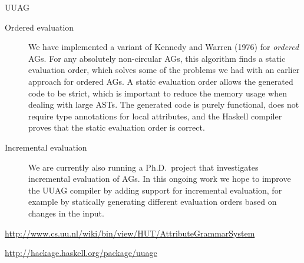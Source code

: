 \begin{hcarentry}[updated]{UUAG}
\begin{description}
\item[Ordered evaluation]
  We have implemented a variant of Kennedy and Warren (1976)
  for \emph{ordered} AGs. For any absolutely non-circular AGs, this algorithm finds a static
  evaluation order, which solves some of the problems we had with an earlier approach for
  ordered AGs. A static evaluation order allows the generated code to be strict, which is
  important to reduce the memory usage when dealing with large ASTs.
  The generated code is purely functional, does not require type
  annotations for local attributes, and the Haskell compiler proves that the static evaluation
  order is correct.

\item[Incremental evaluation]
  We are currently also running a Ph.D.\ project that investigates incremental evaluation of
  AGs. In this ongoing work we hope to improve the UUAG compiler by adding support for
  incremental evaluation, for example by statically generating different evaluation orders
  based on changes in the input.

\end{description}

\FurtherReading
\begin{compactitem}
\item
  \url{http://www.cs.uu.nl/wiki/bin/view/HUT/AttributeGrammarSystem}
\item
  \url{http://hackage.haskell.org/package/uuagc}
\end{compactitem}
\end{hcarentry}
